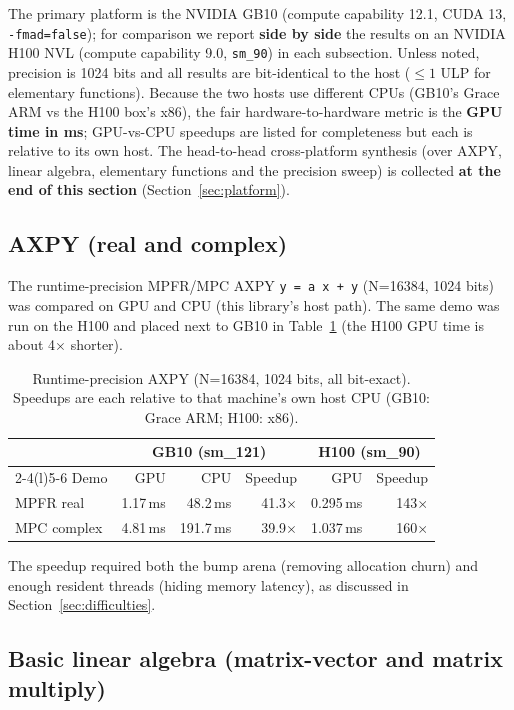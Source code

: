 \documentclass[uplatex,dvipdfmx,a4paper,11pt]{jsarticle}
\newcommand{\code}[1]{\texttt{#1}}
\begin{document}
The primary platform is the NVIDIA GB10 (compute capability 12.1, CUDA 13,
\code{-fmad=false}); for comparison we report \textbf{side by side} the results on
an NVIDIA H100 NVL (compute capability 9.0, \code{sm\_90}) in each subsection.
Unless noted, precision is 1024 bits and all results are bit-identical to the host
($\le 1$ ULP for elementary functions). Because the two hosts use different CPUs
(GB10's Grace ARM vs the H100 box's x86), the fair hardware-to-hardware metric is
the \textbf{GPU time in ms}; GPU-vs-CPU speedups are listed for completeness but
each is relative to its own host. The head-to-head cross-platform synthesis (over
AXPY, linear algebra, elementary functions and the precision sweep) is collected
\textbf{at the end of this section} (Section~\ref{sec:platform}).

\subsection{AXPY (real and complex)}

The runtime-precision MPFR/MPC AXPY \code{y = a\,x + y} (N=16384, 1024 bits) was
compared on GPU and CPU (this library's host path). The same demo was run on the
H100 and placed next to GB10 in Table~\ref{tab:axpy} (the H100 GPU time is about
4$\times$ shorter).

\begin{table}[h]
\centering
\caption{Runtime-precision AXPY (N=16384, 1024 bits, all bit-exact). Speedups are
each relative to that machine's own host CPU (GB10: Grace ARM; H100: x86).}
\label{tab:axpy}
\begin{tabular}{lrrr@{\hskip 2em}rr}
\toprule
 & \multicolumn{3}{c}{GB10 (sm\_121)} & \multicolumn{2}{c}{H100 (sm\_90)}\\
\cmidrule(r){2-4}\cmidrule(l){5-6}
Demo & GPU & CPU & Speedup & GPU & Speedup \\
\midrule
MPFR real    & 1.17\,ms & 48.2\,ms  & 41.3$\times$ & 0.295\,ms & 143$\times$ \\
MPC  complex & 4.81\,ms & 191.7\,ms & 39.9$\times$ & 1.037\,ms & 160$\times$ \\
\bottomrule
\end{tabular}
\end{table}

The speedup required both the bump arena (removing allocation churn) and enough
resident threads (hiding memory latency), as discussed in
Section~\ref{sec:difficulties}.

\subsection{Basic linear algebra (matrix-vector and matrix multiply)}
\end{document}
